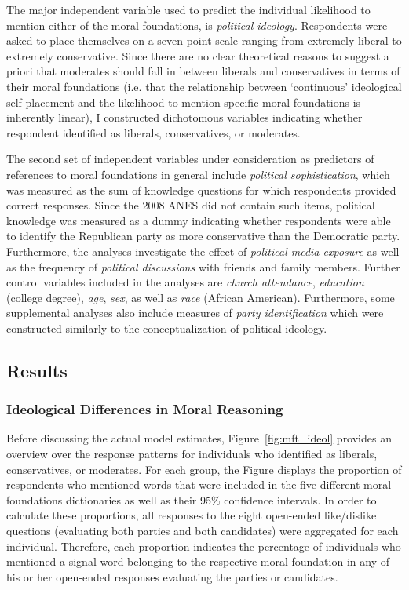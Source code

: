 \documentclass[12pt]{article}
\begin{document}
The major independent variable used to predict the individual likelihood to mention either of the moral foundations, is \textit{political ideology}. Respondents were asked to place themselves on a seven-point scale ranging from extremely liberal to extremely conservative. Since there are no clear theoretical reasons to suggest a priori that moderates should fall in between liberals and conservatives in terms of their moral foundations (i.e. that the relationship between `continuous' ideological self-placement and the likelihood to mention specific moral foundations is inherently linear), I constructed dichotomous variables indicating whether respondent identified as liberals, conservatives, or moderates.

The second set of independent variables under consideration as predictors of references to moral foundations in general include \textit{political sophistication}, which was measured as the sum of knowledge questions for which respondents provided correct responses. Since the 2008 ANES did not contain such items, political knowledge was measured as a dummy indicating whether respondents were able to identify the Republican party as more conservative than the Democratic party. Furthermore, the analyses investigate the effect of \textit{political media exposure} as well as the frequency of \textit{political discussions} with friends and family members. Further control variables included in the analyses are \textit{church attendance}, \textit{education} (college degree), \textit{age}, \textit{sex}, as well as \textit{race} (African American). Furthermore, some supplemental analyses also include measures of \textit{party identification} which were constructed similarly to the conceptualization of political ideology.


\subsection{Results}

\subsubsection{Ideological Differences in Moral Reasoning}

Before discussing the actual model estimates, Figure~\ref{fig:mft_ideol} provides an overview over the response patterns for individuals who identified as liberals, conservatives, or moderates. For each group, the Figure displays the proportion of respondents who mentioned words that were included in the five different moral foundations dictionaries as well as their 95\% confidence intervals. In order to calculate these proportions, all responses to the eight open-ended like/dislike questions (evaluating both parties and both candidates) were aggregated for each individual. Therefore, each proportion indicates the percentage of individuals who mentioned a signal word belonging to the respective moral foundation in any of his or her open-ended responses evaluating the parties or candidates.
\end{document}
